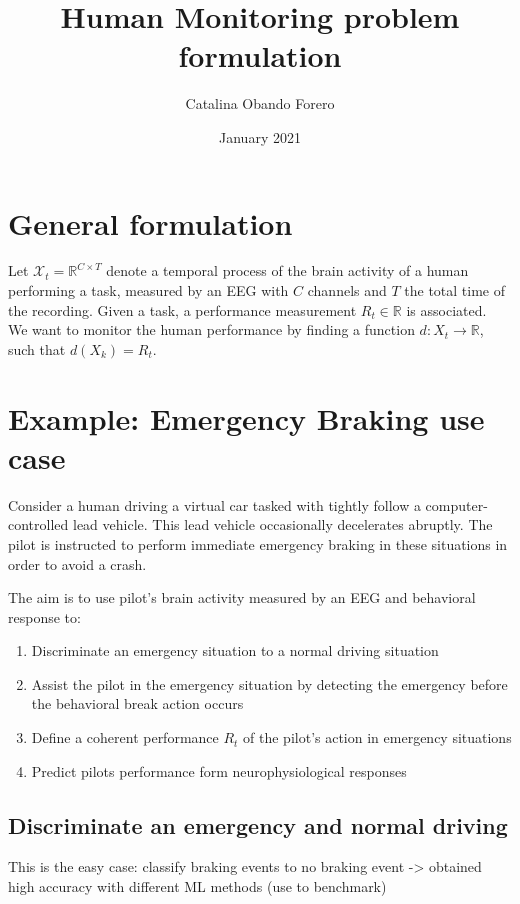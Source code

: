\documentclass{article}
\title{Human Monitoring problem formulation}
\author{Catalina Obando Forero}
\date{January 2021}
\begin{document}
\maketitle

\section{General formulation}
Let  $\mathcal{X}_t =  \mathbb{R}^{C \times T} $ denote a temporal process of the brain activity of a human performing a task, measured by an EEG with $C$ channels and $T$ the total time of the recording. Given a task, a performance measurement $R_t \in \mathbb{R} $ is associated. \\

We want to monitor the human performance by finding a function $d: X_t \rightarrow{\mathbb{R}}$, such that $d(X_k) = R_t$. \\

\section{Example: Emergency Braking use case}
Consider a human driving a virtual car tasked with tightly follow a computer-controlled lead vehicle. This lead vehicle occasionally decelerates abruptly. The pilot is instructed to perform immediate emergency braking in these situations in order to avoid a crash.

The aim is to use pilot's brain activity measured by an EEG and behavioral response to:
\begin{enumerate}
    \item Discriminate an emergency situation to a normal driving situation
    \item Assist the pilot in the emergency situation by detecting the emergency before the behavioral break action occurs 
    \item Define a coherent performance $R_t$ of the pilot's action in emergency situations
    \item Predict pilots performance form neurophysiological responses
\end{enumerate}

\subsection{Discriminate an emergency and normal driving}
This is the easy case: classify braking events to no braking event -> obtained high accuracy with different ML methods (use to benchmark) 
\end{document}
